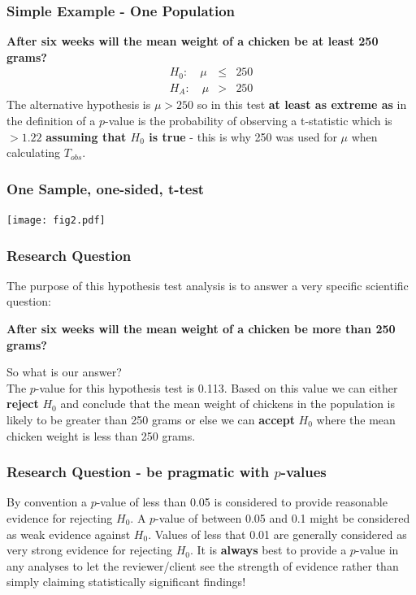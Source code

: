 \documentclass{beamer}\usepackage[]{graphicx}\usepackage[]{color}
\begin{document}
{{{%

\begin{frame}
\frametitle{Simple Example - One Population}
 {\bfseries After six weeks will the mean weight of a chicken be at least 250 grams?}
\begin{eqnarray}
H_0:\quad \mu &\le& 250 \nonumber\\
H_A:\quad \mu &>& 250 \nonumber
\end{eqnarray}
The alternative hypothesis is $\mu > 250$ so in this test
{\bfseries at least as extreme as} in the definition of a $p$-value is the
probability of observing a t-statistic which is $>1.22$
{\bfseries assuming that $H_0$ is true} - this is why 250 was used for $\mu$ when calculating $T_{obs}$.
\\\vspace{0.2cm}
\end{frame}


\begin{frame}\frametitle{One Sample, one-sided, t-test}
\texttt{[image: fig2.pdf]}
\end{frame}


\begin{frame}
\frametitle{Research Question}
The purpose of this hypothesis test analysis is to answer a very specific
scientific question:
\begin{center}{\bfseries After six weeks will the mean weight of a chicken be
more than 250 grams?}\end{center}
So what is our answer?\\\vspace{0.3cm}
The $p$-value for this hypothesis test is 0.113. Based on this value we can either
{\bfseries \large reject} $H_0$ and conclude that the mean weight of chickens
in the population is likely to be greater than 250 grams or else we can
{\bfseries \large accept} $H_0$ where the mean chicken weight is less than 250 grams.
\\\vspace{0.3cm}
\end{frame}


\begin{frame}
\frametitle{Research Question - be pragmatic with $p$-values}
\vspace{0.2cm}
By convention a $p$-value of less than 0.05 is considered to provide reasonable
evidence for rejecting $H_0$. A $p$-value of between 0.05 and 0.1 might be
considered as weak evidence against $H_0$. Values of less that 0.01 are generally
considered as very strong evidence for rejecting $H_0$. It is {\bfseries always}
best to provide a $p$-value in any analyses to let the reviewer/client see the
strength of evidence rather than simply claiming statistically significant
findings!
\vspace{0.2cm}
\end{frame}

}}}
\end{document}
